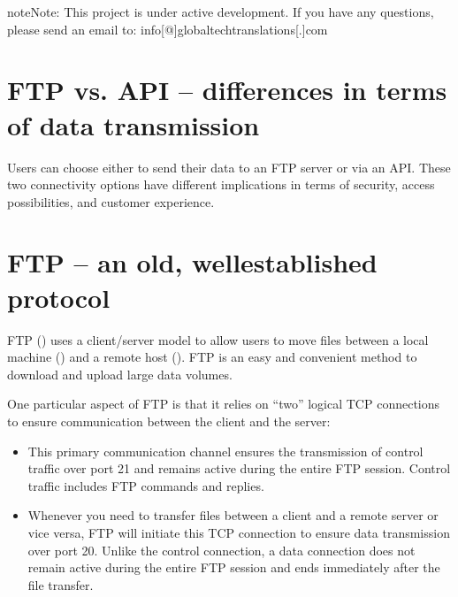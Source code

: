 \documentclass[a4paper,10pt,english,openany,oneside]{sphinxmanual}
\let\sphinxpxdimen\pdfpxdimen\else\newdimen\sphinxpxdimen
\begin{document}
\begin{sphinxadmonition}{note}{Note:}
\sphinxAtStartPar
This project is under active development. If you have any questions, please send an email to: info{[}@{]}globaltech\sphinxhyphen{}translations{[}.{]}com \sphinxhyphen{} 
\end{sphinxadmonition}

\sphinxstepscope


\chapter{FTP vs. API – differences in terms of data transmission}
\label{\detokenize{ftp-vs-api:ftp-vs-api-differences-in-terms-of-data-transmission}}\label{\detokenize{ftp-vs-api::doc}}
\sphinxAtStartPar
Users can choose either to send their data to an FTP server or via an API. These two connectivity options have different implications in terms of security, access possibilities, and customer experience.

\begin{figure}[H]
\centering

\noindent\sphinxincludegraphics[width=527.12116\sphinxpxdimen,height=346.62805\sphinxpxdimen]{{network-ftp}.png}
\end{figure}


\chapter{FTP – an old, well\sphinxhyphen{}established protocol}
\label{\detokenize{ftp-vs-api:ftp-an-old-well-established-protocol}}
\sphinxAtStartPar
FTP () uses a client/server model to allow users to move files between a local machine () and a remote host (). FTP is an easy and convenient method to download and upload large data volumes.

\sphinxAtStartPar
One particular aspect of FTP is that it relies on “two” logical TCP connections to ensure communication between the client and the server:
\begin{itemize}
\item {} 
\sphinxAtStartPar
{} This primary communication channel ensures the transmission of control traffic over port 21 and remains active during the entire FTP session. Control traffic includes FTP commands and replies.

\item {} 
\sphinxAtStartPar
{} Whenever you need to transfer files between a client and a remote server or vice versa, FTP will initiate this TCP connection to ensure data transmission over port 20. Unlike the control connection, a data connection does not remain active during the entire FTP session and ends immediately after the file transfer.

\end{itemize}
\end{document}
